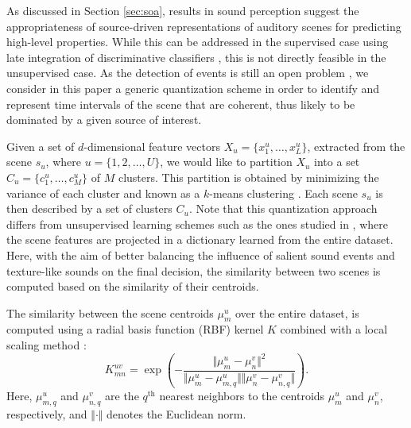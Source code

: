 \documentclass[smallextended]{svjour3}
\begin{document}
As discussed in Section \ref{sec:soa}, results in sound perception suggest the appropriateness of source-driven representations of auditory scenes for predicting high-level properties. While this can be addressed in the supervised case using late integration of discriminative classifiers \cite{Anden2014}, this is not directly feasible in the unsupervised case. As the detection of events is still an open problem \cite{7100934}, we consider in this paper a generic quantization scheme in order to identify and represent time intervals of the scene that are coherent, thus likely to be dominated by a given source of interest.

Given a set of $d$-dimensional feature vectors $X_u = \{x_1^u, \ldots, x_L^u\}$, extracted from the scene $s_u$, where $u=\lbrace 1,2,\ldots,U\rbrace$, we would like to partition $X_u$ into a set $C_u = \{c^u_1, \ldots, c^u_M\}$ of $M$ clusters. This partition is obtained by minimizing the variance of each cluster and known as a $k$-means clustering \cite{lloyd}.
Each scene $s_u$ is then described by a set of clusters $C_u$. Note that this quantization approach differs from unsupervised learning schemes such as the ones studied in \cite{bisot2016acoustic}, where the scene features are projected in a dictionary learned from the entire dataset. Here, with the aim of better balancing the influence of salient sound events and texture-like sounds on the final decision, the similarity between two scenes is computed based on the similarity of their centroids.

The similarity between the scene centroids $\mu_m^u$ over the entire dataset, is computed using a radial basis function (RBF) kernel $K$ combined with a local scaling method \cite{selfTuneManor2004}:
\begin{equation}
\label{eq:kc}
K_{mn}^{uv} = \exp\left( - \dfrac{\Vert \mu_m^u - \mu_n^v \Vert^2}{\Vert \mu_m^u - \mu_{m,q}^u \Vert \Vert \mu_n^v - \mu_{n,q}^v \Vert} \right).
\end{equation}
Here, $\mu_{m,q}^u$ and $\mu_{n,q}^v$ are the $q^{\textrm{th}}$ nearest neighbors to the centroids $\mu_m^u$ and $\mu_n^v$, respectively, and $\Vert \cdot \Vert$ denotes the Euclidean norm.
\end{document}
